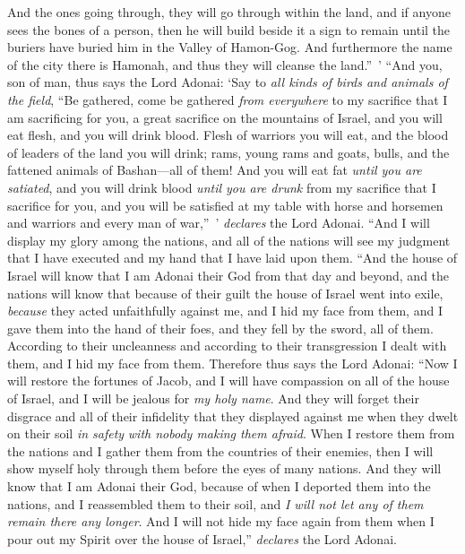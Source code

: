 \begin{biblechapter}
\verse And the ones going through, they will go through within the land, and if anyone sees the bones of a person, then he will build beside it a sign to remain until the buriers have buried him in the Valley of Hamon-Gog.
\verse And furthermore the name of the city there is Hamonah, and thus they will cleanse the land.” ’
\verse “And you, son of man, thus says the Lord Adonai: ‘Say to \textit{all kinds of birds and animals of the field}, “Be gathered, come be gathered \textit{from everywhere} to my sacrifice that I am sacrificing for you, a great sacrifice on the mountains of Israel, and you will eat flesh, and you will drink blood.
\verse Flesh of warriors you will eat, and the blood of leaders of the land you will drink; rams, young rams and goats, bulls, and the fattened animals of Bashan—all of them!
\verse And you will eat fat \textit{until you are satiated}, and you will drink blood \textit{until you are drunk} from my sacrifice that I sacrifice for you,
\verse and you will be satisfied at my table with horse and horsemen and warriors and every man of war,” ’ \textit{declares} the Lord Adonai.
\verse “And I will display my glory among the nations, and all of the nations will see my judgment that I have executed and my hand that I have laid upon them.
\verse “And the house of Israel will know that I am Adonai their God from that day and beyond,
\verse and the nations will know that because of their guilt the house of Israel went into exile, \textit{because} they acted unfaithfully against me, and I hid my face from them, and I gave them into the hand of their foes, and they fell by the sword, all of them.
\verse According to their uncleanness and according to their transgression I dealt with them, and I hid my face from them.
\verse Therefore thus says the Lord Adonai: “Now I will restore the fortunes of Jacob, and I will have compassion on all of the house of Israel, and I will be jealous for \textit{my holy name}.
\verse And they will forget their disgrace and all of their infidelity that they displayed against me when they dwelt on their soil \textit{in safety} \textit{with nobody making them afraid}.
\verse When I restore them from the nations and I gather them from the countries of their enemies, then I will show myself holy through them before the eyes of many nations.
\verse And they will know that I am Adonai their God, because of when I deported them into the nations, and I reassembled them to their soil, and \textit{I will not let any of them remain there any longer}.
\verse And I will not hide my face again from them when I pour out my Spirit over the house of Israel,” \textit{declares} the Lord Adonai.
\end{biblechapter}

